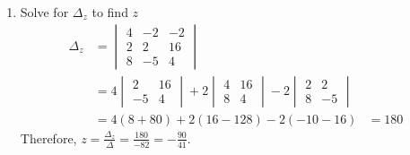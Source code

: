 \documentclass{report}
\begin{document}
{\begin{enumerate}
        \item Solve for $ \Delta_z $ to find $ z $ \[
                  \begin{align*}
                      \Delta_z & = \begin{vmatrix}
                                       4 & - 2 & - 2 \\
                                       2 & 2   & 16  \\
                                       8 & - 5 & 4
                                   \end{vmatrix}                                       \\
                               & = 4 \begin{vmatrix}
                                         2   & 16 \\
                                         - 5 & 4
                                     \end{vmatrix} + 2 \begin{vmatrix}
                                                           4 & 16 \\
                                                           8 & 4
                                                       \end{vmatrix} - 2 \begin{vmatrix}
                                                                             2 & 2   \\
                                                                             8 & - 5
                                                                         \end{vmatrix} \\
                               & = 4(8 + 80) + 2(16 - 128) - 2( - 10 - 16) & = 180
                  \end{align*}
              \]
              Therefore, $ z = \frac{\Delta_z}{\Delta} = \frac{180}{- 82} = - \frac{90}{41}
              $.
    \end{enumerate}}

\end{document}
